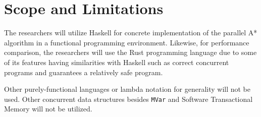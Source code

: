 




\section{Scope and Limitations}
The researchers will utilize Haskell for concrete implementation 
of the parallel A* algorithm in a functional programming environment.
Likewise, for performance comparison, the researchers 
will use the Rust programming language due to some of its features having
similarities with Haskell such as correct concurrent programs\cite{Saligrama2019}
and guarantees a relatively safe program\cite{Jung2018}.

Other purely-functional languages or lambda notation for generality
will not be used. Other concurrent data structures besides \verb|MVar| and Software
Transactional Memory will not be utilized.